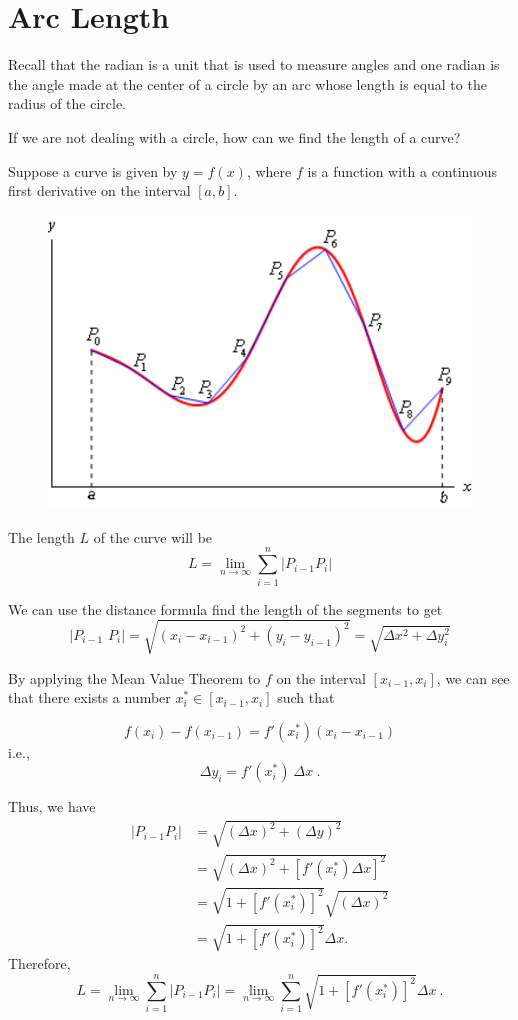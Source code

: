 \documentclass[compacto,10pt,comentarios]{aleph-notas}
\def \ds{\displaystyle}
\begin{document}
\encabezado

\section*{Arc Length}

Recall that the radian is a unit that is used to measure angles and one radian is the angle made at the center of a circle by an arc whose length is equal to the radius of the circle.

If we are not dealing with a circle, how can we find the length of a curve?

Suppose a curve is given by $y = f(x)$, where $f$ is a function with a continuous first derivative on the interval $[a,b]$.

\begin{figure}[h!]
\centering	
	\includegraphics[width=0.7\linewidth]{../Images/6_5_arclength_01.pdf}
\end{figure}

The length $L$ of the curve will be 
$$
    L = \ds \lim_{n \to \infty}\sum_{i=1}^{n}|P_{i-1}P_i|
$$

We can use the distance formula find the length of the segments to get
$$
    \left| {{P_{i - 1}}\,\,{P_i}} \right| = \sqrt {{{\left( {{x_i} - {x_{i - 1}}} \right)}^2} + {{\left( {{y_i} - {y_{i - 1}}} \right)}^2}}  = \sqrt {\Delta {x^2} + \Delta y_i^2}
$$

By applying the Mean Value Theorem to $f$ on the interval $[x_{i-1}, x_i]$, we can see that there exists a number $x_i^* \in [x_{i - 1}, x_{i}]$ such that

$$
    f(x_i)-f(x_{i-1})= f'(x_i^*)(x_i-x_{i-1})
$$
i.e.,
$$
    \Delta y_i = f'(x_i^*) ~ \Delta x ~ .
$$

Thus, we have
\begin{align*}
	|P_{i-1}P_i|
    &= \sqrt{(\Delta x)^2+(\Delta y)^2} \\
    &=\sqrt{(\Delta x)^2+[f'(x_i^*)\Delta x]^2} \\
	&= \sqrt{1+[f'(x_i^*)]^2}\sqrt{(\Delta x)^2} \\
    &=  \sqrt{1+[f'(x_i^*)]^2} \Delta x .
\end{align*}
Therefore, 
$$
    L = \ds \lim_{n \to \infty} \sum_{i=1}^{n} |P_{i-1}P_i| = \lim_{n \to \infty} \sum_{i=1}^{n} \sqrt{1+[f'(x_i^*)]^2} \Delta x ~ .
$$
\end{document}
